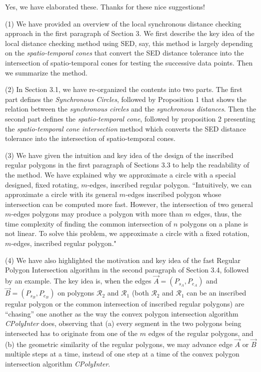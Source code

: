 \documentclass{letter}
\newcommand{\vv}{\overrightarrow}
\begin{document}
Yes, we have elaborated these. Thanks for these nice suggestions!

(1) We have provided an overview of the local synchronous distance checking approach in the first paragraph of Section 3. We first describe the key idea of the local distance checking method using SED, say, this method is largely depending on the \emph{spatio-temporal cones} that convert the SED distance tolerance into the intersection of spatio-temporal cones for testing the successive data points. Then we summarize the method.

(2) In Section 3.1, we have re-organized the contents into two parts. The first part defines the \emph{Synchronous Circles}, followed by Proposition 1 that shows the relation between the \textit{synchronous circles} and the \textit{synchronous distances}. Then the second part defines the \textit{spatio-temporal cone}, followed by proposition 2 presenting the \textit{spatio-temporal cone intersection} method which converts the SED distance tolerance into the intersection of spatio-temporal cones.

(3) We have given the intuition and key idea of the design of the inscribed regular polygons in the first paragraph of Sections 3.3 to help the readability of the method. We have explained why we approximate a circle with a special designed, fixed rotating, $m$-edges, inscribed regular polygon. ``Intuitively, we can approximate a circle with its general $m$-edges inscribed polygon {whose intersection can be computed more fast}. However, the intersection of two general $m$-edges polygons may produce a polygon with more than $m$ edges, thus, the time complexity of finding the common intersection of $n$ polygons on a plane is not linear. To solve this problem, we approximate a circle with a fixed rotation, $m$-edges, inscribed regular polygon."

(4) We have also highlighted the motivation and key idea of the fast Regular Polygon Intersection algorithm in the second paragraph of Section 3.4, followed by an example. The key idea is, when the edges $\vv{A} = (P_{s_A}, P_{e_A})$ and $\vv{B} = (P_{s_B}, P_{e_B})$ on polygons $\mathcal{R}_2$ and $\mathcal{R}_1$ (both $\mathcal{R}_2$ and $\mathcal{R}_1$ can be an inscribed regular polygon or the common intersection of inscribed regular polygons) are ``chasing'' one another as the way the convex polygon intersection algorithm \emph{CPolyInter} does,
observing that (a) every segment in the two polygons being intersected has to originate from one of the $m$ edges of the regular polygons, and (b) the geometric similarity of the regular polygons,
we may advance edge $\vv{A}$ or $\vv{B}$ multiple steps at a time, instead of one step at a time of the convex polygon intersection algorithm \emph{CPolyInter}.
\end{document}
